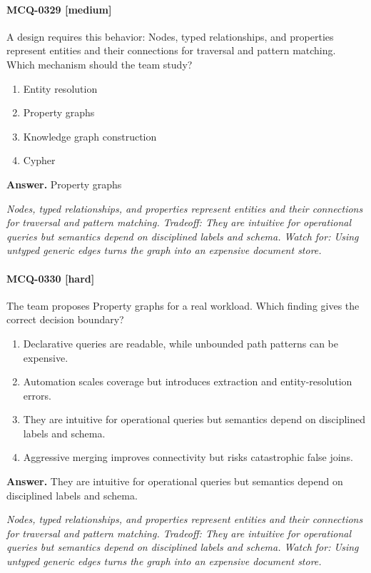 \paragraph{MCQ-0329 [medium]} A design requires this behavior: Nodes, typed relationships, and properties represent entities and their connections for traversal and pattern matching. Which mechanism should the team study?
\begin{enumerate}[label=\Alph*.]
\item Entity resolution
\item Property graphs
\item Knowledge graph construction
\item Cypher
\end{enumerate}
\noindent\textbf{Answer.} Property graphs
\par\textit{Nodes, typed relationships, and properties represent entities and their connections for traversal and pattern matching. Tradeoff: They are intuitive for operational queries but semantics depend on disciplined labels and schema. Watch for: Using untyped generic edges turns the graph into an expensive document store.}
\paragraph{MCQ-0330 [hard]} The team proposes Property graphs for a real workload. Which finding gives the correct decision boundary?
\begin{enumerate}[label=\Alph*.]
\item Declarative queries are readable, while unbounded path patterns can be expensive.
\item Automation scales coverage but introduces extraction and entity-resolution errors.
\item They are intuitive for operational queries but semantics depend on disciplined labels and schema.
\item Aggressive merging improves connectivity but risks catastrophic false joins.
\end{enumerate}
\noindent\textbf{Answer.} They are intuitive for operational queries but semantics depend on disciplined labels and schema.
\par\textit{Nodes, typed relationships, and properties represent entities and their connections for traversal and pattern matching. Tradeoff: They are intuitive for operational queries but semantics depend on disciplined labels and schema. Watch for: Using untyped generic edges turns the graph into an expensive document store.}
